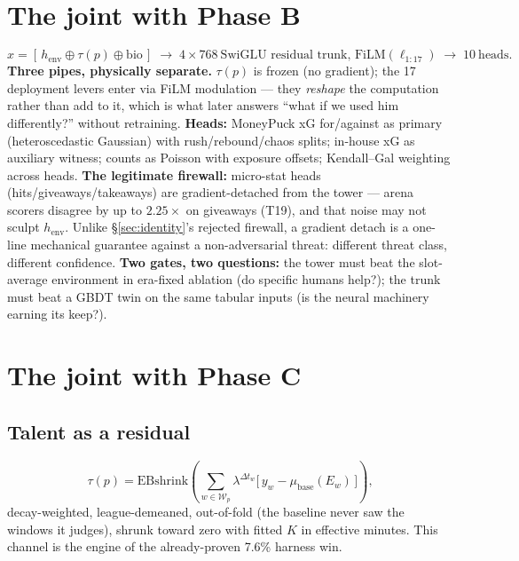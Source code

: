 \documentclass[11pt]{article}
\newcommand{\henv}{\ensuremath{h_{\mathrm{env}}}}
\begin{document}
\section{The joint with Phase B}
\label{sec:phaseb}
\begin{equation}
x = [\, \henv \oplus \tau(p) \oplus \mathrm{bio} \,] \;\rightarrow\;
4\times768\ \text{SwiGLU residual trunk, FiLM}(\ell_{1:17})
\;\rightarrow\; 10\ \text{heads}.
\end{equation}
\textbf{Three pipes, physically separate.} $\tau(p)$ is frozen (no gradient);
the 17 deployment levers enter via FiLM modulation --- they \emph{reshape} the
computation rather than add to it, which is what later answers ``what if we
used him differently?'' without retraining. \textbf{Heads:} MoneyPuck xG
for/against as primary (heteroscedastic Gaussian) with rush/rebound/chaos
splits; in-house xG as auxiliary witness; counts as Poisson with exposure
offsets; Kendall--Gal weighting across heads. \textbf{The legitimate firewall:}
micro-stat heads (hits/giveaways/takeaways) are gradient-detached from the
tower --- arena scorers disagree by up to $2.25\times$ on giveaways (T19), and
that noise may not sculpt \henv{}. Unlike \S\ref{sec:identity}'s rejected
firewall, a gradient detach is a one-line mechanical guarantee against a
non-adversarial threat: different threat class, different confidence.
\textbf{Two gates, two questions:} the tower must beat the slot-average
environment in era-fixed ablation (do specific humans help?); the trunk must
beat a GBDT twin on the same tabular inputs (is the neural machinery earning
its keep?).

\section{The joint with Phase C}
\label{sec:k1}
\subsection{Talent as a residual}
\begin{equation}
\tau(p) = \mathrm{EBshrink}\!\left( \sum_{w \in \mathcal{W}_p}
\lambda^{\Delta t_w}\big[\, y_w - \mu_{\mathrm{base}}(E_w) \,\big] \right),
\end{equation}
decay-weighted, league-demeaned, out-of-fold (the baseline never saw the
windows it judges), shrunk toward zero with fitted $K$ in effective minutes.
This channel is the engine of the already-proven 7.6\% harness win.
\end{document}
